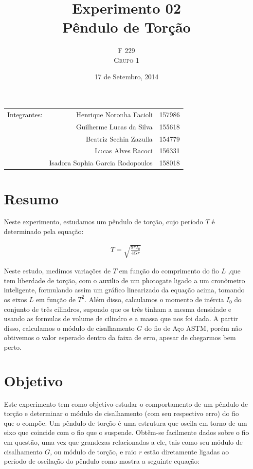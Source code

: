 \documentclass[a4paper]{article}
\title{Experimento 02 \\ Pêndulo de Torção}
\author{F 229 \\ \textsc{Grupo 1}}
\date{17 de Setembro, 2014}
\begin{document}
\maketitle

\begin{center}
	\begin{tabular}{l r l}
		Integrantes: & Henrique Noronha Facioli & 157986 \\
		& Guilherme Lucas da Silva & 155618 \\
		& Beatriz Sechin Zazulla & 154779 \\
		& Lucas Alves Racoci & 156331 \\
		& Isadora Sophia Garcia Rodopoulos & 158018 \\
	\end{tabular}
\end{center}




\section{Resumo}

Neste experimento, estudamos um pêndulo de torção, cujo período $T$ é determinado pela equação:

\begin{align}
   T = \sqrt{\frac{8 \pi I_0}{4 G r}}\
   \label{eq:Periodo}
\end{align}

Neste estudo, medimos variações de $T$ em função do comprimento do fio $L$ ,que tem liberdade de torção, com o auxilio de um photogate ligado a um cronômetro inteligente, formulando assim um gráfico linearizado da equação acima, tomando os eixos $L$ em função de $T^2$. Além disso, calculamos o momento de inércia $I_0$ do conjunto de três cilindros, supondo que os três tinham a mesma densidade e usando as formulas de volume de cilindro e a massa que nos foi dada.
A partir disso, calculamos o módulo de cisalhamento $G$ do fio de Aço ASTM, porém não obtivemos o valor esperado dentro da faixa de erro, apesar de chegarmos bem perto.


\section{Objetivo}

Este experimento tem como objetivo estudar o comportamento de um pêndulo de torção e determinar o módulo de cisalhamento (com seu respectivo erro) do fio que o compõe. Um pêndulo de torção é uma estrutura que oscila em torno de um eixo que coincide com o fio que o suspende. Obtêm-se facilmente dados sobre o fio em questão, uma vez que grandezas relacionadas a ele, tais como seu módulo de cisalhamento $G$, ou módulo de torção, e raio $r$ estão diretamente ligadas ao período de oscilação do pêndulo como mostra a seguinte equação:
\end{document}
